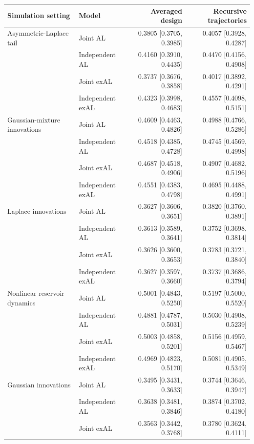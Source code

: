 \begin{table}[p]
\centering
\footnotesize
\setlength{\tabcolsep}{3pt}
\renewcommand{\arraystretch}{1.08}
\begin{tabular}{@{}>{\raggedright\arraybackslash}p{}lrr@{}}
\toprule
Simulation setting & Model & Averaged design & Recursive trajectories \\
\midrule
Asymmetric-Laplace tail & Joint AL & 0.3805 [0.3705, 0.3985] & 0.4057 [0.3928, 0.4287] \\
 & Independent AL & 0.4160 [0.3910, 0.4435] & 0.4470 [0.4156, 0.4908] \\
 & Joint exAL & 0.3737 [0.3676, 0.3858] & 0.4017 [0.3892, 0.4291] \\
 & Independent exAL & 0.4323 [0.3998, 0.4683] & 0.4557 [0.4098, 0.5151] \\
\addlinespace[2pt]
Gaussian-mixture innovations & Joint AL & 0.4609 [0.4463, 0.4826] & 0.4988 [0.4766, 0.5286] \\
 & Independent AL & 0.4518 [0.4385, 0.4728] & 0.4745 [0.4569, 0.4998] \\
 & Joint exAL & 0.4687 [0.4518, 0.4906] & 0.4907 [0.4682, 0.5196] \\
 & Independent exAL & 0.4551 [0.4383, 0.4798] & 0.4695 [0.4488, 0.4991] \\
\addlinespace[2pt]
Laplace innovations & Joint AL & 0.3627 [0.3606, 0.3651] & 0.3820 [0.3760, 0.3891] \\
 & Independent AL & 0.3613 [0.3589, 0.3641] & 0.3752 [0.3698, 0.3814] \\
 & Joint exAL & 0.3626 [0.3600, 0.3653] & 0.3783 [0.3721, 0.3840] \\
 & Independent exAL & 0.3627 [0.3597, 0.3660] & 0.3737 [0.3686, 0.3794] \\
\addlinespace[2pt]
Nonlinear reservoir dynamics & Joint AL & 0.5001 [0.4843, 0.5250] & 0.5197 [0.5000, 0.5520] \\
 & Independent AL & 0.4881 [0.4787, 0.5031] & 0.5030 [0.4908, 0.5239] \\
 & Joint exAL & 0.5003 [0.4858, 0.5201] & 0.5156 [0.4959, 0.5467] \\
 & Independent exAL & 0.4969 [0.4823, 0.5170] & 0.5081 [0.4905, 0.5349] \\
\addlinespace[2pt]
Gaussian innovations & Joint AL & 0.3495 [0.3431, 0.3633] & 0.3744 [0.3646, 0.3947] \\
 & Independent AL & 0.3638 [0.3481, 0.3846] & 0.3874 [0.3702, 0.4180] \\
 & Joint exAL & 0.3563 [0.3442, 0.3768] & 0.3780 [0.3624, 0.4111] \\

\end{tabular}
\end{table}
